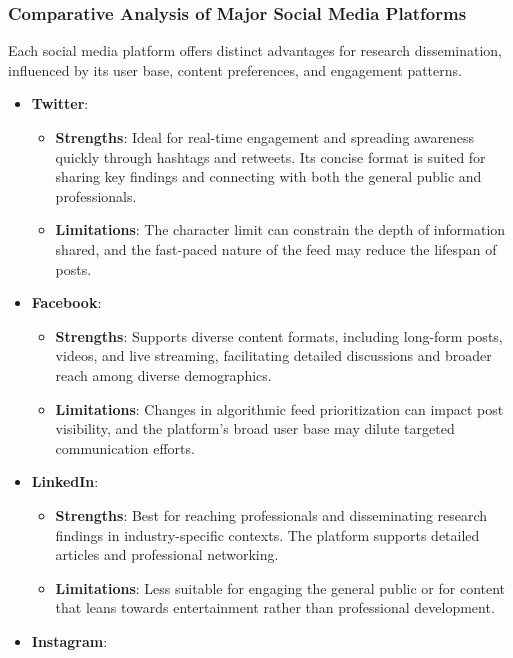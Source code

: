 \documentclass[
]{book}
\providecommand{\tightlist}{%
  \setlength{\itemsep}{0pt}\setlength{\parskip}{0pt}}
\begin{document}
\hypertarget{comparative-analysis-of-major-social-media-platforms}{%
\subsubsection{Comparative Analysis of Major Social Media Platforms}\label{comparative-analysis-of-major-social-media-platforms}}

Each social media platform offers distinct advantages for research dissemination, influenced by its user base, content preferences, and engagement patterns.

\begin{itemize}
\tightlist
\item
  \textbf{Twitter}:

  \begin{itemize}
  \tightlist
  \item
    \textbf{Strengths}: Ideal for real-time engagement and spreading awareness quickly through hashtags and retweets. Its concise format is suited for sharing key findings and connecting with both the general public and professionals.
  \item
    \textbf{Limitations}: The character limit can constrain the depth of information shared, and the fast-paced nature of the feed may reduce the lifespan of posts.
  \end{itemize}
\item
  \textbf{Facebook}:

  \begin{itemize}
  \tightlist
  \item
    \textbf{Strengths}: Supports diverse content formats, including long-form posts, videos, and live streaming, facilitating detailed discussions and broader reach among diverse demographics.
  \item
    \textbf{Limitations}: Changes in algorithmic feed prioritization can impact post visibility, and the platform's broad user base may dilute targeted communication efforts.
  \end{itemize}
\item
  \textbf{LinkedIn}:

  \begin{itemize}
  \tightlist
  \item
    \textbf{Strengths}: Best for reaching professionals and disseminating research findings in industry-specific contexts. The platform supports detailed articles and professional networking.
  \item
    \textbf{Limitations}: Less suitable for engaging the general public or for content that leans towards entertainment rather than professional development.
  \end{itemize}
\item
  \textbf{Instagram}:


\end{itemize}
\end{document}
